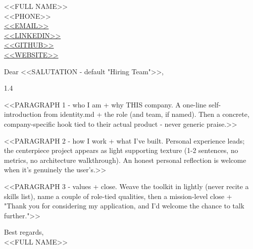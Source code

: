 \documentclass[letterpaper,11pt]{article}
\begin{document}
\begin{singlespace}
<<FULL NAME>> \\
<<PHONE>> \\
\href{mailto:<<EMAIL>>}{<<EMAIL>>} \\
\href{https://<<LINKEDIN URL>>}{<<LINKEDIN>>} \\
\href{https://<<GITHUB URL>>}{<<GITHUB>>} \\
\href{https://<<WEBSITE>>}{<<WEBSITE>>}
\end{singlespace}

\vspace{9pt}

Dear <<SALUTATION - default "Hiring Team">>,

\vspace{6pt}

\begin{spacing}{1.4}
\setlength{\parskip}{5pt}

<<PARAGRAPH 1 - who I am + why THIS company. A one-line self-introduction from
identity.md + the role (and team, if named). Then a concrete, company-specific
hook tied to their actual product - never generic praise.>>

<<PARAGRAPH 2 - how I work + what I've built. Personal experience leads; the
centerpiece project appears as light supporting texture (1-2 sentences, no
metrics, no architecture walkthrough). An honest personal reflection is welcome
when it's genuinely the user's.>>

<<PARAGRAPH 3 - values + close. Weave the toolkit in lightly (never recite a
skills list), name a couple of role-tied qualities, then a mission-level close +
"Thank you for considering my application, and I'd welcome the chance to talk further.">>

\end{spacing}

\vspace{6pt}

\begin{singlespace}
Best regards, \\
<<FULL NAME>>
\end{singlespace}
\end{document}
